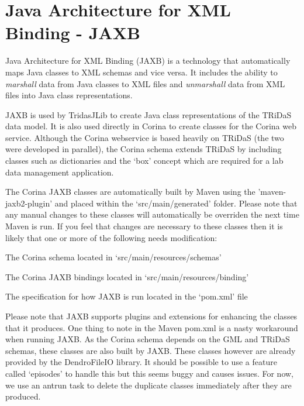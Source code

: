 \section{Java Architecture for XML Binding - JAXB}
\label{txt:jaxb}

Java Architecture for XML Binding (JAXB) is a technology that automatically maps Java classes to XML schemas and vice versa.  It includes the ability to \emph{marshall} data from Java classes to XML files and \emph{unmarshall} data from XML files into Java class representations.  

JAXB is used by TridasJLib to create Java class representations of the TRiDaS data model.  It is also used directly in Corina to create classes for the Corina web service.  Although the Corina webservice is based heavily on TRiDaS (the two were developed in parallel), the Corina schema extends TRiDaS by including classes such as dictionaries and the `box' concept which are required for a lab data management application.  

The Corina JAXB classes are automatically built by Maven using the 'maven-jaxb2-plugin' and placed within the `src/main/generated' folder.  Please note that any manual changes to these classes will automatically be overriden the next time Maven is run.  If you feel that changes are necessary to these classes then it is likely that one or more of the following needs modification:

\begin{itemize*}
 \item The Corina schema located in `src/main/resources/schemas'
 \item The Corina JAXB bindings located in `src/main/resources/binding'
 \item The specification for how JAXB is run located in the `pom.xml' file
\end{itemize*}

Please note that JAXB supports plugins and extensions for enhancing the classes that it produces.  One thing to note in the Maven pom.xml is a nasty workaround when running JAXB.  As the Corina schema depends on the GML and TRiDaS schemas, these classes are also built by JAXB.  These classes however are already provided by the DendroFileIO library.  It should be possible to use a feature called `episodes' to handle this but this seems buggy and causes issues.  For now, we use an antrun task to delete the duplicate classes immediately after they are produced.


